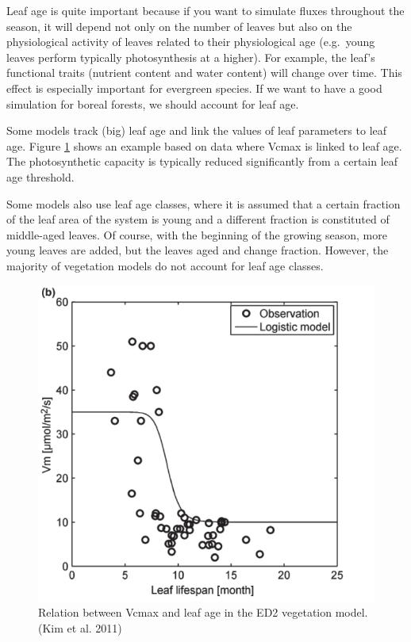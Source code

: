 \documentclass[
  12pt,
  oneside]{book}
\begin{document}
Leaf age is quite important because if you want to simulate fluxes throughout the season, it will depend not only on the number of leaves but also on the physiological activity of leaves related to their physiological age (e.g.~young leaves perform typically photosynthesis at a higher). For example, the leaf's functional traits (nutrient content and water content) will change over time. This effect is especially important for evergreen species. If we want to have a good simulation for boreal forests, we should account for leaf age.

Some models track (big) leaf age and link the values of leaf parameters to leaf age. Figure \ref{fig:f46} shows an example based on data where Vcmax is linked to leaf age. The photosynthetic capacity is typically reduced significantly from a certain leaf age threshold.

Some models also use leaf age classes, where it is assumed that a certain fraction of the leaf area of the system is young and a different fraction is constituted of middle-aged leaves. Of course, with the beginning of the growing season, more young leaves are added, but the leaves aged and change fraction. However, the majority of vegetation models do not account for leaf age classes.

\begin{figure}

{\centering \includegraphics[width=0.8\linewidth]{figures/chap4/f46_vc_age} 

}

\caption{Relation  between Vcmax and leaf age in the ED2 vegetation model. (Kim et al. 2011)}\label{fig:f46}
\end{figure}
\end{document}
